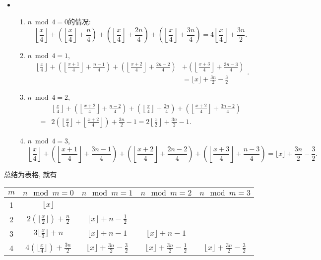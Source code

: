 \documentclass{ctexart}
\begin{document}
\begin{itemize}
\item \begin{enumerate}
    \item $n \bmod 4=0$的情况: $$\left\lfloor\frac{x}{4}\right\rfloor+\left(\left\lfloor\frac{x}{4}\right\rfloor+\frac{n}{4}\right)+\left(\left\lfloor\frac{x}{4}\right\rfloor+\frac{2 n}{4}\right)+\left(\left\lfloor\frac{x}{4}\right\rfloor+\frac{3 n}{4}\right)=4\left\lfloor\frac{x}{4}\right\rfloor+\frac{3 n}{2}.$$
    \item $n \bmod 4=1$, $$\begin{aligned}\left\lfloor\frac{x}{4}\right\rfloor+\left(\left\lfloor\frac{x+1}{4}\right\rfloor+\frac{n-1}{4}\right)+\left(\left\lfloor\frac{x+2}{4}\right\rfloor+\frac{2 n-2}{4}\right) & +\left(\left\lfloor\frac{x+3}{4}\right\rfloor+\frac{3 n-3}{4}\right) \\ & =\lfloor x\rfloor+\frac{3 n}{2}-\frac{3}{2}\end{aligned}.$$
    \item $n \bmod 4=2$, $$\begin{aligned} & \left\lfloor\frac{x}{4}\right\rfloor+\left(\left\lfloor\frac{x+2}{4}\right\rfloor+\frac{n-2}{4}\right)+\left(\left\lfloor\frac{x}{4}\right\rfloor+\frac{2 n}{4}\right)+\left(\left\lfloor\frac{x+2}{4}\right\rfloor+\frac{3 n-2}{4}\right) \\ = & 2\left(\left\lfloor\frac{x}{4}\right\rfloor+\left\lfloor\frac{x+2}{4}\right\rfloor\right)+\frac{3 n}{2}-1=2\left\lfloor\frac{x}{2}\right\rfloor+\frac{3 n}{2}-1 .\end{aligned}$$
    \item $n \bmod 4=3$, $$\left\lfloor\frac{x}{4}\right\rfloor+\left(\left\lfloor\frac{x+1}{4}\right\rfloor+\frac{3 n-1}{4}\right)+\left(\left\lfloor\frac{x+2}{4}\right\rfloor+\frac{2 n-2}{4}\right)+\left(\left\lfloor\frac{x+3}{4}\right\rfloor+\frac{n-3}{4}\right)=\lfloor x \rfloor+\frac{3 n}{2}-\frac{3}{2}.$$
\end{enumerate}
\end{itemize}

总结为表格, 就有

\begin{center}
    \begin{tabular}{|c|c|c|c|c|}
        \hline
        $m$ & $n \mod m = 0$ & $n \mod m = 1$ & $n \mod m = 2$ & $n \mod m = 3$ \\
        \hline
        1 & $\lfloor x \rfloor$ & & & \\
        \hline
        2 & $2\left(\lfloor \frac{x}{2} \rfloor\right) + \frac{n}{2}$ & $\lfloor x \rfloor + n - \frac{1}{2}$ & & \\
        \hline
        3 & $3\lfloor \frac{x}{3} \rfloor + n$ & $\lfloor x \rfloor + n - 1$ & $\lfloor x \rfloor + n - 1$ & \\
        \hline
        4 & $4\left(\lfloor \frac{x}{4} \rfloor\right) + \frac{3n}{2}$ & $\lfloor x \rfloor + \frac{3n}{2} - \frac{3}{2}$ & $\lfloor x \rfloor + \frac{3n}{2} - \frac{1}{2}$ & $\lfloor x \rfloor + \frac{3n}{2} - \frac{3}{2}$ \\
        \hline
        \end{tabular}
\end{center}
\end{document}
